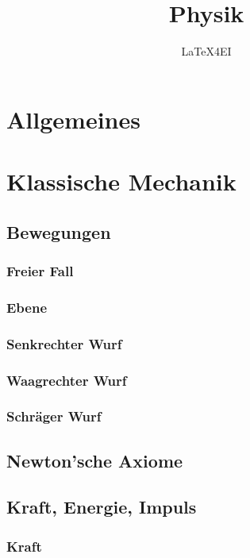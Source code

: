 \documentclass[german, 8pt]{latex4ei/latex4ei_sheet}
\title{Physik}
\author{LaTeX4EI}                    %
\begin{document}
\maketitle   %


\section{Allgemeines}

\section{Klassische Mechanik}
\subsection{Bewegungen}
\subsubsection{Freier Fall}
\subsubsection{Ebene}
\subsubsection{Senkrechter Wurf}
\subsubsection{Waagrechter Wurf}
\subsubsection{Schräger Wurf}
\subsection{Newton'sche Axiome}
\subsection{Kraft, Energie, Impuls}
\subsubsection{Kraft}
\end{document}
